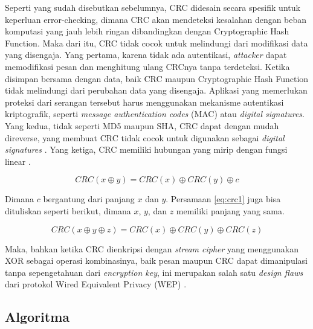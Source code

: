 Seperti yang sudah disebutkan sebelumnya, CRC didesain secara spesifik untuk keperluan error-checking, dimana CRC akan mendeteksi kesalahan dengan beban komputasi yang jauh lebih ringan dibandingkan dengan Cryptographic Hash Function. Maka dari itu, CRC tidak cocok untuk melindungi dari modifikasi data yang disengaja. Yang pertama, karena tidak ada autentikasi, \emph{attacker} dapat memodifikasi pesan dan menghitung ulang CRCnya tanpa terdeteksi. Ketika disimpan bersama dengan data, baik CRC maupun Cryptographic Hash Function tidak melindungi dari perubahan data yang disengaja. Aplikasi yang memerlukan proteksi dari serangan tersebut harus menggunakan mekanisme autentikasi kriptografik, seperti \emph{message authentication codes} (MAC) atau \emph{digital signatures}. Yang kedua, tidak seperti MD5 maupun SHA, CRC dapat dengan mudah direverse, yang membuat CRC tidak cocok untuk digunakan sebagai \emph{digital signatures} \citep{martin2006}. Yang ketiga, CRC memiliki hubungan yang mirip dengan fungsi linear \citep{poncho2016}. 

\begin{equation}
  \label{eq:crc1}
  CRC(x\oplus y) = CRC(x) \oplus CRC(y) \oplus c
\end{equation}

Dimana \(c\) bergantung dari panjang \(x\) dan \(y\). Persamaan \ref{eq:crc1} juga bisa dituliskan seperti berikut, dimana \(x\), \(y\), dan \(z\) memiliki panjang yang sama.

\begin{equation}
  \label{eq:crc2}
  CRC(x\oplus y \oplus z) = CRC(x) \oplus CRC(y) \oplus CRC(z)
\end{equation}

Maka, bahkan ketika CRC dienkripsi dengan \emph{stream cipher} yang menggunakan XOR sebagai operasi kombinasinya, baik pesan maupun CRC dapat dimanipulasi tanpa sepengetahuan dari \emph{encryption key}, ini merupakan salah satu \emph{design flaws} dari protokol Wired Equivalent Privacy (WEP) \citep{winget2003}.

\subsection{Algoritma}
\label{subsec:crcalgorithm}

